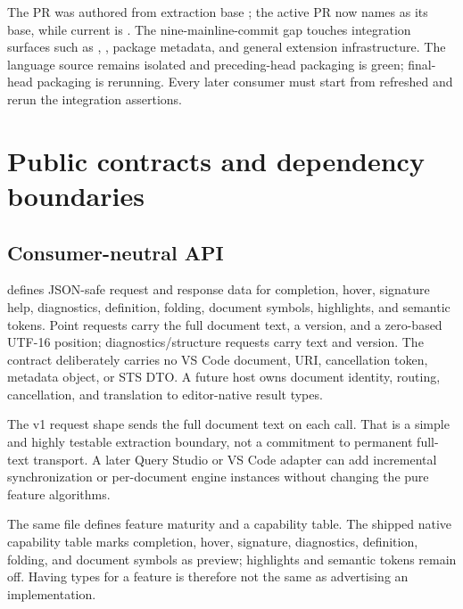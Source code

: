 \documentclass[11pt]{article}
\newcommand{\code}[1]{\texttt{\detokenize{#1}}}
\begin{document}
\begin{boundarybox}[title={Branch-drift note}]
The PR was authored from extraction base \code{95cf790e5}; the active PR now names \code{53b707bbe} as its base, while current \code{main} is \code{c6d2baa442}. The nine-mainline-commit gap touches integration surfaces such as , , package metadata, and general extension infrastructure. The language source remains isolated and preceding-head packaging is green; final-head packaging is rerunning. Every later consumer must start from refreshed \code{main} and rerun the integration assertions.
\end{boundarybox}

\section{Public contracts and dependency boundaries}

\subsection{Consumer-neutral API}

 defines JSON-safe request and response data for completion, hover, signature help, diagnostics, definition, folding, document symbols, highlights, and semantic tokens. Point requests carry the full document text, a version, and a zero-based UTF-16 position; diagnostics/structure requests carry text and version. The contract deliberately carries no VS Code document, URI, cancellation token, metadata object, or STS DTO. A future host owns document identity, routing, cancellation, and translation to editor-native result types.

The v1 request shape sends the full document text on each call. That is a simple and highly testable extraction boundary, not a commitment to permanent full-text transport. A later Query Studio or VS Code adapter can add incremental synchronization or per-document engine instances without changing the pure feature algorithms.

The same file defines feature maturity and a capability table. The shipped native capability table marks completion, hover, signature, diagnostics, definition, folding, and document symbols as preview; highlights and semantic tokens remain off. Having types for a feature is therefore not the same as advertising an implementation.
\end{document}
